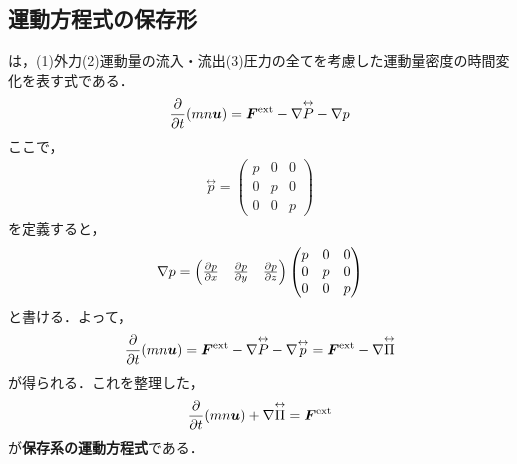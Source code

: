 \documentclass{report}
\begin{document}
  \subsection{運動方程式の保存形}
    は，(1)外力(2)運動量の流入・流出(3)圧力の全てを考慮した運動量密度の時間変化を表す式である．
    \begin{align}
      \pdv{t}(mn\bm{u}) = \bm{F}^{\mathrm{ext}} - \nabla \overset{\leftrightarrow}{P} - \nabla p
    \end{align}
    ここで，
    \begin{align}
      \overset{\leftrightarrow}{p} = 
      \begin{pmatrix}
        p & 0 & 0\\
        0 & p & 0\\
        0 & 0 & p
      \end{pmatrix}
    \end{align}
    を定義すると，
    \begin{align}
      \nabla p = \begin{pmatrix}
        \pdv{p}{x}&
        \pdv{p}{y}&
        \pdv{p}{z}
      \end{pmatrix}
      \begin{pmatrix}
        p & 0 & 0\\
        0 & p & 0\\
        0 & 0 & p
      \end{pmatrix}
    \end{align}
    と書ける．よって，
    \begin{align}
      \pdv{t}(mn\bm{u}) = \bm{F}^{\mathrm{ext}} - \nabla \overset{\leftrightarrow}{P} - \nabla \overset{\leftrightarrow}{p} = \bm{F}^{\mathrm{ext}} - \nabla \overset{\leftrightarrow}{\Pi}
    \end{align}
    が得られる．これを整理した，
    \begin{align}
      \pdv{t}(mn\bm{u}) + \nabla \overset{\leftrightarrow}{\Pi} = \bm{F}^{\mathrm{ext}} \label{eq:momentum4}
    \end{align}
    が\textbf{保存系の運動方程式}である．
\end{document}
